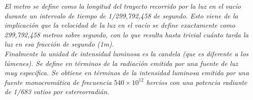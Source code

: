 \documentclass{article}
\begin{document}
\textit{ El metro se define como la longitud del trayecto recorrido por la luz en el vacío durante un intervalo de tiempo de 1/299,792,458 de segundo. Esto viene de la implicación que la velocidad de la luz en el vacío se define exactamente como 299,792,458 metros sobre segundo, con lo que resulta hasta trivial cuánto tarda la luz en esa fracción de segundo (1m).}\\

\textit{Finalmente la unidad de intensidad luminosa es la candela (que es diferente a los lúmenes). Se define en términos de la radiación emitida por una fuente de luz muy específica. Se obtiene en términos de la intensidad luminosa emitida por una fuente monocromática de frecuencia $540 × 10^12$ hercios con una potencia radiante de 1/683 vatios por estereorradián.}\\\\\\
\end{document}
